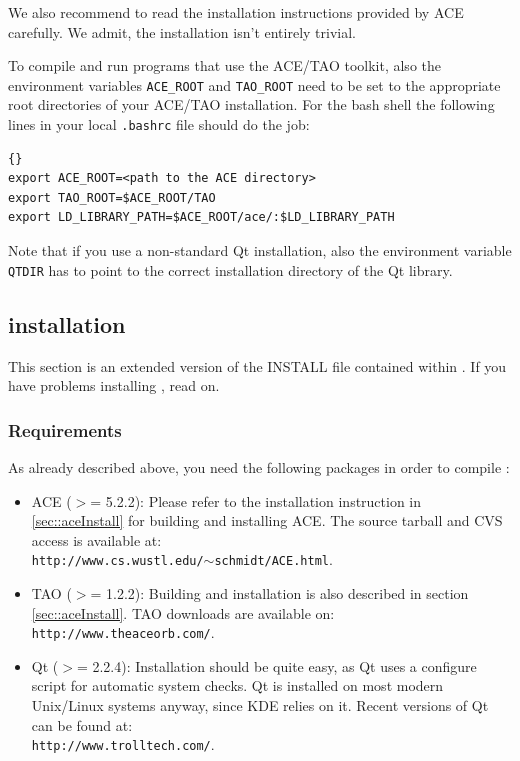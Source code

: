 \documentclass[10pt]{book}
\begin{document}
We also recommend to read the installation instructions provided
by ACE carefully. We admit, the installation isn't entirely trivial.

To compile and run programs that use the ACE/TAO toolkit, also the
environment variables {\tt ACE\_ROOT} and {\tt TAO\_ROOT} need
to be set to the appropriate root directories of your ACE/TAO
installation. For the bash shell the following lines in your local
{\tt .bashrc} file should do the job:

\begin{lstlisting}[frame=tb]{}
export ACE_ROOT=<path to the ACE directory>
export TAO_ROOT=$ACE_ROOT/TAO
export LD_LIBRARY_PATH=$ACE_ROOT/ace/:$LD_LIBRARY_PATH
\end{lstlisting}

Note that if you use a non-standard Qt installation, also the
environment variable \texttt{QTDIR} has to point to the correct
installation directory of the Qt library.

\subsection{\miro installation}

This section is an extended version of the INSTALL file contained
within \miro. If you have problems installing \miro, read on.

\subsubsection{Requirements}

As already described above, you need the following packages in order
to compile \miro:
\begin{itemize}
\item ACE ($>$= 5.2.2): Please refer to the installation instruction
  in \ref{sec::aceInstall} for building and installing ACE. The source
  tarball and CVS access is available at:\\
  \texttt{http://www.cs.wustl.edu/$\sim$schmidt/ACE.html}.
\item TAO ($>$= 1.2.2): Building and installation is also described in
  section \ref{sec::aceInstall}. TAO downloads are available on:\\
  \texttt{http://www.theaceorb.com/}.
\item Qt ($>$= 2.2.4): Installation should be quite easy, as Qt uses a
  configure script for automatic system checks. Qt is installed on
  most modern Unix/Linux systems anyway, since KDE relies on
  it. Recent versions of Qt can be found at:\\
  \texttt{http://www.trolltech.com/}.
\end{itemize}
\end{document}
